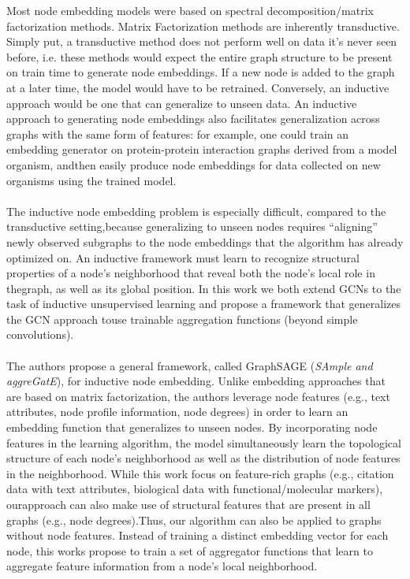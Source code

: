 \documentclass[12pt,a4paper]{article}
\begin{document}
Most node embedding models were based on spectral decomposition/matrix factorization methods. Matrix Factorization methods are inherently transductive. Simply put, a transductive method does not perform well on data it’s never seen before, i.e. these methods would expect the entire graph structure to be present on train time to generate node embeddings. If a new node is added to the graph at a later time, the model would have to be retrained. Conversely, an inductive approach would be one that can generalize to unseen data. An inductive approach to generating node embeddings also facilitates generalization across graphs with the same form of features: for example, one could train an embedding generator on protein-protein interaction graphs derived from a model organism, andthen easily produce node embeddings for data collected on new organisms using the trained model.
\\ \\
The inductive node embedding problem is especially difficult, compared to the transductive setting,because generalizing to unseen nodes requires “aligning” newly observed subgraphs to the node embeddings that the algorithm has already optimized on.  An inductive framework must learn to recognize structural properties of a node’s neighborhood that reveal both the node’s local role in thegraph, as well as its global position. In this work we both extend GCNs to the task of inductive unsupervised learning and propose a framework that generalizes the GCN approach touse trainable aggregation functions (beyond simple convolutions).
\\ \\
The authors propose a general framework, called GraphSAGE (\textit{SAmple and aggreGatE}), for inductive node embedding.  Unlike embedding approaches that are based on matrix factorization, the authors leverage node features (e.g., text attributes, node profile information, node degrees) in order to learn an embedding function that generalizes to unseen nodes. By incorporating node features in the learning algorithm, the model simultaneously learn the topological structure of each node’s neighborhood as well as the distribution of node features in the neighborhood.  While this work focus on feature-rich graphs (e.g., citation data with text attributes, biological data with functional/molecular markers), ourapproach can also make use of structural features that are present in all graphs (e.g., node degrees).Thus, our algorithm can also be applied to graphs without node features. Instead of training a distinct embedding vector for each node, this works propose to train a set of aggregator functions that learn to aggregate feature information from a node’s local neighborhood.
\end{document}
